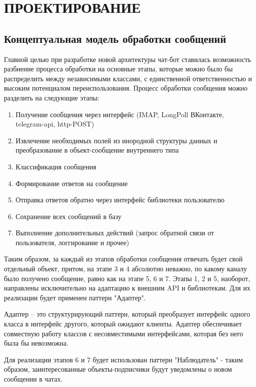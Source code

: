 \section{ПРОЕКТИРОВАНИЕ}
    \subsection{Концептуальная модель обработки сообщений}
    Главной целью при разработке новой архитектуры чат-бот ставилась возможность
    разбиение процесса обработки на основные этапы, которые можно было бы
    распределить между независимыми классами, с единственной ответственностью и
    высоким потенциалом переиспользования.
    Процесс обработки сообщения можно разделить на следующие этапы:
    \begin{enumerate}
        \item Получение сообщения через интерфейс (IMAP, LongPoll ВКонтакте, 
        telegram-api, http-POST)
        \item Извлечение необходимых полей из инородной структуры данных и 
        преобразование в объект-сообщение внутреннего типа
        \item Классификация сообщения
        \item Формирование ответов на сообщение
        \item Отправка ответов обратно через интерфейс библиотеки пользователю
        \item Сохранение всех сообщений в базу
        \item Выполнение дополнительных действий (запрос обратной связи от
        пользователя, логгирование и прочее)
    \end{enumerate}

    Таким образом, за каждый из этапов обработки сообщения отвечать будет свой 
    отдельный объект, притом, на этапе 3 и 4 абсолютно неважно, по какому 
    каналу было получено сообщение, равно как на этапе 5, 6 и 7. Этапы 1, 2 и 5, 
    наоборот, направлены исключительно на адаптацию к внешним API и библиотекам.
    Для их реализации будет применен паттерн "Адаптер". 
    
    Адаптер -- это структурирующий паттерн, который 
    преобразует интерфейс одного класса в интерфейс другого, который ожидают
    клиенты. Адаптер обеспечивает совместную работу классов с несовместимыми
    интерфейсами, которая без него была бы невозможна.
    
    Для реализации этапов
    6 и 7 будет использован паттерн "Наблюдатель" - таким образом,
    заинтересованные объекты-подписчики будут уведомлены о новом сообщении в чатах.
    
